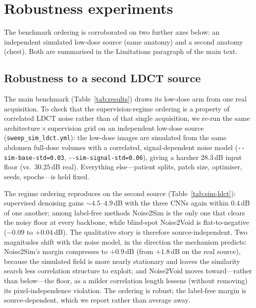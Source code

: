 \appendix

\section{Robustness experiments}
\label{app:robustness}
The benchmark ordering is corroborated on two further axes below: an
independent simulated low-dose source (same anatomy) and a second
anatomy (chest). Both are summarised in the Limitations paragraph of
the main text.

\subsection{Robustness to a second LDCT source}
\label{sec:sim-ldct}
The main benchmark (Table~\ref{tab:results}) draws its low-dose arm from one real
acquisition.  To check that the supervision-regime ordering is a property of
correlated LDCT noise rather than of that single acquisition, we re-run the same
architecture\,$\times$\,supervision grid on an independent low-dose source
(\texttt{sweep\_sim\_ldct.yml}): the low-dose images are simulated from the
same abdomen full-dose volumes with a correlated, signal-dependent noise model
(\texttt{-{}-sim-base-std=0.03}, \texttt{-{}-sim-signal-std=0.06}), giving a
harsher $28.3$\,dB input floor (vs.\ $30.25$\,dB real).  Everything else---patient
splits, patch size, optimiser, seeds, epochs---is held fixed.

The regime ordering reproduces on the second source
(Table~\ref{tab:sim-ldct}): supervised denoising gains $\sim$$4.5$--$4.9$\,dB with
the three CNNs again within $0.4$\,dB of one another; among label-free methods
Noise2Sim is the only one that clears the noisy floor at every backbone,
while blind-spot Noise2Void is flat-to-negative ($-0.09$ to $+0.04$\,dB).  The
qualitative story is therefore source-independent.  Two magnitudes shift with the
noise model, in the direction the mechanism predicts: Noise2Sim's margin
compresses to $+0.9$\,dB (from $+1.8$\,dB on the real source), because the
simulated field is more nearly stationary and leaves the similarity search less
correlation structure to exploit; and Noise2Void moves toward---rather than
below---the floor, as a milder correlation length lessens (without removing) its
pixel-independence violation.  The ordering is robust; the label-free margin is
source-dependent, which we report rather than average away.

